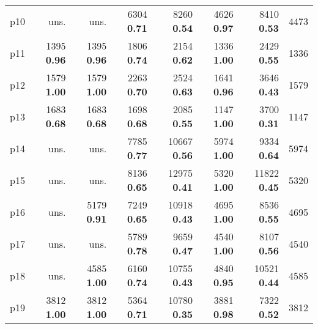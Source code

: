 \begin{tabular}{lrrrrrrr}
\multicolumn{1}{l|}{p10} & uns. & uns. & {\footnotesize 6304} \textbf{0.71} & {\footnotesize 8260} \textbf{0.54} & {\footnotesize 4626} \textbf{0.97} & {\footnotesize 8410} \textbf{0.53} & \multicolumn{1}{|r}{4473}\\
\multicolumn{1}{l|}{p11} & {\footnotesize 1395} \textbf{0.96} & {\footnotesize 1395} \textbf{0.96} & {\footnotesize 1806} \textbf{0.74} & {\footnotesize 2154} \textbf{0.62} & {\footnotesize 1336} \textbf{1.00} & {\footnotesize 2429} \textbf{0.55} & \multicolumn{1}{|r}{1336}\\
\multicolumn{1}{l|}{p12} & {\footnotesize 1579} \textbf{1.00} & {\footnotesize 1579} \textbf{1.00} & {\footnotesize 2263} \textbf{0.70} & {\footnotesize 2524} \textbf{0.63} & {\footnotesize 1641} \textbf{0.96} & {\footnotesize 3646} \textbf{0.43} & \multicolumn{1}{|r}{1579}\\
\multicolumn{1}{l|}{p13} & {\footnotesize 1683} \textbf{0.68} & {\footnotesize 1683} \textbf{0.68} & {\footnotesize 1698} \textbf{0.68} & {\footnotesize 2085} \textbf{0.55} & {\footnotesize 1147} \textbf{1.00} & {\footnotesize 3700} \textbf{0.31} & \multicolumn{1}{|r}{1147}\\
\multicolumn{1}{l|}{p14} & uns. & uns. & {\footnotesize 7785} \textbf{0.77} & {\footnotesize 10667} \textbf{0.56} & {\footnotesize 5974} \textbf{1.00} & {\footnotesize 9334} \textbf{0.64} & \multicolumn{1}{|r}{5974}\\
\multicolumn{1}{l|}{p15} & uns. & uns. & {\footnotesize 8136} \textbf{0.65} & {\footnotesize 12975} \textbf{0.41} & {\footnotesize 5320} \textbf{1.00} & {\footnotesize 11822} \textbf{0.45} & \multicolumn{1}{|r}{5320}\\
\multicolumn{1}{l|}{p16} & uns. & {\footnotesize 5179} \textbf{0.91} & {\footnotesize 7249} \textbf{0.65} & {\footnotesize 10918} \textbf{0.43} & {\footnotesize 4695} \textbf{1.00} & {\footnotesize 8536} \textbf{0.55} & \multicolumn{1}{|r}{4695}\\
\multicolumn{1}{l|}{p17} & uns. & uns. & {\footnotesize 5789} \textbf{0.78} & {\footnotesize 9659} \textbf{0.47} & {\footnotesize 4540} \textbf{1.00} & {\footnotesize 8107} \textbf{0.56} & \multicolumn{1}{|r}{4540}\\
\multicolumn{1}{l|}{p18} & uns. & {\footnotesize 4585} \textbf{1.00} & {\footnotesize 6160} \textbf{0.74} & {\footnotesize 10755} \textbf{0.43} & {\footnotesize 4840} \textbf{0.95} & {\footnotesize 10521} \textbf{0.44} & \multicolumn{1}{|r}{4585}\\
\multicolumn{1}{l|}{p19} & {\footnotesize 3812} \textbf{1.00} & {\footnotesize 3812} \textbf{1.00} & {\footnotesize 5364} \textbf{0.71} & {\footnotesize 10780} \textbf{0.35} & {\footnotesize 3881} \textbf{0.98} & {\footnotesize 7322} \textbf{0.52} & \multicolumn{1}{|r}{3812}\\

\end{tabular}
